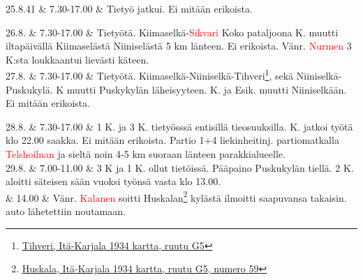 \documentclass[11pt,a5paper,oneside]{book}
\begin{document}
25.8.41 & 7.30-17.00 & Tietyö jatkui. Ei mitään erikoista. \\

\taulustop


26.8. & 7.30-17.00 & Tietyötä. Kiimaselkä-\textcolor{red}{Sikvari} \newline Koko pataljoona  K. muutti iltapäivällä Kiimaselästä Niiniselästä 5 km länteen. \newline Ei erikoista. Vänr. \textcolor{red}{Nurmen} 3 K:sta loukkaantui lievästi käteen. \newline\newline \\

27.8. & 7.30-17.00 & Tietyötä. Kiimaselkä-Niiniselkä-Tihveri\footnote{\href{https://www.google.fi/maps/place/61\%C2\%B020'14.6\%22N+32\%C2\%B052'39.7\%22E/@61.337376,32.8755083,903m/}{Tihveri, Itä-Karjala 1934 kartta, ruutu G5}}, sekä Niiniselkä-Puskukylä.  K muutti Puskykylän läheisyyteen.  K. ja Esik. muutti Niiniselkään. \newline Ei mitään erikoista. \\
\newpage

28.8. & 7.30-17.00 & 1 K. ja 3 K. tietyösssä entisillä tieosuuksilla.  K. jatkoi työtä klo 22.00 saakka. Ei mitään erikoista. \newline Partio 1+4 liekinheitinj. partiomatkalla \textcolor{red}{Telshoilnan} ja sieltä noin 4-5 km suoraan länteen parakkialueelle. \newline\newline\newline \\

29.8. & 7.00-11.00 & 3 K ja 1 K. ollut tietöissä. Pääpaino Puskukylän tiellä. 2 K. aloitti säteisen sään vuoksi työnsä vasta klo 13.00. \\

& 14.00 & Vänr. \textcolor{red}{Kalanen} soitti Huskalan\footnote{\href{https://www.google.fi/maps/place/\%D0\%93\%D1\%83\%CC\%81\%D1\%88\%D0\%BA\%D0\%B0\%D0\%BB\%D0\%B0,+Republic+of+Karelia,+Russia,+186016/@61.2176076,32.8546529,3626m/}{Huskala, Itä-Karjala 1934 kartta, ruutu G5, numero 59}} kylästä ilmoitti saapuvansa takaisin. auto lähetettiin noutamaan. \\
\end{document}
